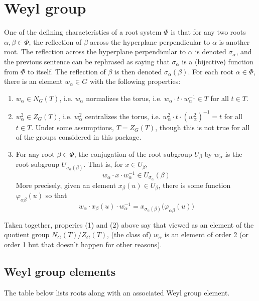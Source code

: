 \documentclass[11pt]{article}
\newcommand{\noi}{\noindent}
\newcommand{\inv}{^{-1}}
\newcommand{\sig}{\sigma}
\theoremstyle{definition}
\begin{document}
\newpage
\section{Weyl group}

One of the defining characteristics of a root system $\Phi$ is that for any two roots $\alpha, \beta \in \Phi$, the reflection of $\beta$ across the hyperplane perpendicular to $\alpha$ is another root. The reflection across the hyperplane perpendicular to $\alpha$ is denoted $\sig_\alpha$, and the previous sentence can be rephrased as saying that $\sig_\alpha$ is a (bijective) function from $\Phi$ to itself. The reflection of $\beta$ is then denoted $\sig_\alpha(\beta)$. For each root $\alpha \in \Phi$, there is an element $w_\alpha \in G$ with the following properties:
\begin{enumerate}
	\item $w_\alpha \in N_G(T)$, i.e. $w_\alpha$ normalizes the torus, i.e. $w_\alpha \cdot t \cdot w_\alpha \inv \in T$ for all $t \in T$.
	\item $w_\alpha^2 \in Z_G(T)$, i.e. $w_\alpha^2$ centralizes the torus, i.e. $w_\alpha^2 \cdot t \cdot (w_\alpha^2) \inv = t$ for all $t \in T$. Under some assumptions, $T = Z_G(T)$, though this is not true for all of the groups considered in this package.
	\item For any root $\beta \in \Phi$, the conjugation of the root subgroup $U_\beta$ by $w_\alpha$ is the root subgroup $U_{\sig_\alpha(\beta)}$. That is, for $x \in U_\beta$,
	\[
		w_\alpha \cdot x \cdot w_\alpha \inv \in U_{\sig_{\alpha}}(\beta)
	\]
	More precisely, given an element $x_\beta(u) \in U_\beta$, there is some function $\varphi_{\alpha \beta}(u)$ so that
	\[
		w_\alpha \cdot x_\beta(u) \cdot w_\alpha \inv = x_{\sig_{\alpha}(\beta)} \Big( \varphi_{\alpha \beta}(u) \Big)
	\]
\end{enumerate}
Taken together, properies (1) and (2) above say that viewed as an element of the quotient group $N_G(T)/Z_G(T)$, (the class of) $w_\alpha$ is an element of order 2 (or order 1 but that doesn't happen for other reasons).

\subsection{Weyl group elements}

\noi The table below lists roots along with an associated Weyl group element.

\bigskip
\end{document}
